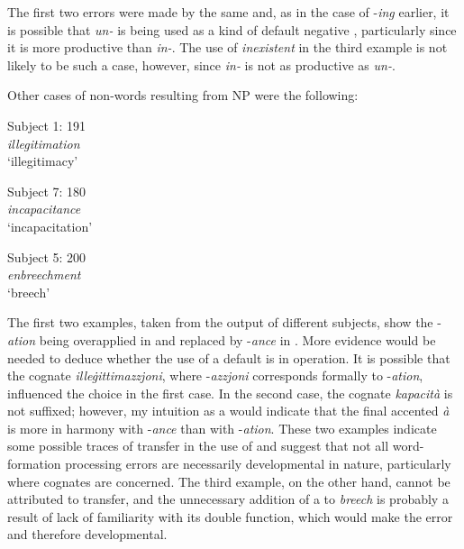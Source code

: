 \documentclass[output=paper]{langsci/langscibook}
\begin{document}
The first two errors were made by the same  and, as in the case
of -\textit{ing} earlier, it is possible that \textit{un-} is being
used as a kind of default negative , particularly since it is
more productive than \textit{in-}. The use of \textit{inexistent} in
the third example is not likely to be such a case, however, since
\textit{in-} is not as productive as \textit{un-}.



Other cases of non-words resulting from NP  
were the following:


\begin{exe}  
  \ex{}
  {Subject 1: 191}\\
    \textit{illegitimation}\\
    {‘illegitimacy’}
  \label{ex8}
\end{exe}

\begin{exe}  
  \ex{}
  {Subject 7: 180}\\
    \textit{incapacitance}\\
    {‘incapacitation’}
  \label{ex9}
\end{exe}

\begin{exe}  
  \ex{}
  {Subject 5: 200}\\
    \textit{enbreechment}\\
    {‘breech’}
  \label{ex10}
\end{exe}

The first two examples, taken from the output of different subjects,
show the  -\textit{ation} being overapplied in  and replaced
by -\textit{ance} in . More evidence would be needed to deduce
whether the use of a default  is in operation. It is possible
that the  cognate \textit{ille\.gittimazzjoni}, where
-\textit{azzjoni} corresponds formally to -\textit{ation}, influenced
the choice in the first case. In the second case, the  cognate
\textit{kapacità} is not suffixed;
however, my intuition as a   would indicate that the final accented \textit{à} is more in harmony
with -\textit{ance} than with
-\textit{ation}. These two examples indicate some possible traces of
transfer in the use of  and suggest that not all word-formation
processing errors are necessarily developmental in nature,
particularly where cognates are concerned. The third example, on the
other hand, cannot be attributed to transfer, and the unnecessary
addition of a  to \textit{breech} is probably a result of lack
of familiarity with its double function, which would make the error
 and therefore developmental.
\end{document}
